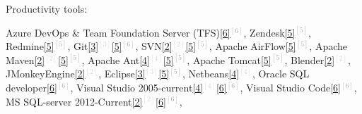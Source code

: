 \begin{cventries}
  \cventry
    {Productivity tools:} %
    {} %
    {} %
    {} %
    {
      \vspace{0.1cm}
      \begin{cvitems} %
        \item[] {        
        \textcolor{rainbowcolor-olive}{Azure DevOps \& Team Foundation Server (TFS)\textcolor{darkgray}{\textcolor{darkgray}{\ref{6}{$^{[6]}$}}}},
        \textcolor{rainbowcolor-olive}{Zendesk\textcolor{darkgray}{\ref{5}{$^{[5]}$}}},
        \textcolor{rainbowcolor-olive}{Redmine\textcolor{darkgray}{\ref{5}{$^{[5]}$}}},
        \textcolor{rainbowcolor-olive}{Git\textcolor{lightgray}{\ref{3}{$^{[3]}$}}\textcolor{darkgray}{\ref{5}{$^{[6]}$}}}, 
        \textcolor{rainbowcolor-olive}{SVN\textcolor{lightgray}{\ref{2}{$^{[2]}$}}\textcolor{darkgray}{\ref{5}{$^{[5]}$}}},
        \textcolor{rainbowcolor-olive}{Apache AirFlow\textcolor{darkgray}{\ref{5}{$^{[5]}$}}},
        \textcolor{rainbowcolor-olive}{Apache Maven\textcolor{lightgray}{\ref{2}{$^{[2]}$}}\textcolor{darkgray}{\ref{5}{$^{[5]}$}}},
        \textcolor{rainbowcolor-olive}{Apache Ant\textcolor{lightgray}{\ref{4}{$^{[4]}$}}\textcolor{darkgray}{\ref{5}{$^{[5]}$}}},  
        \textcolor{rainbowcolor-olive}{Apache Tomcat\textcolor{darkgray}{\ref{5}{$^{[5]}$}}}, 
        \textcolor{rainbowcolor-olive}{Blender\textcolor{lightgray}{\ref{2}{$^{[2]}$}}}, 
        \textcolor{rainbowcolor-olive}{JMonkeyEngine\textcolor{lightgray}{\ref{2}{$^{[2]}$}}}, 
        \textcolor{rainbowcolor-olive}{Eclipse\textcolor{lightgray}{\ref{3}{$^{[3]}$}}\textcolor{darkgray}{\ref{5}{$^{[5]}$}}},  
        \textcolor{rainbowcolor-olive}{Netbeans\textcolor{lightgray}{\ref{4}{$^{[4]}$}}}, 
        \textcolor{rainbowcolor-olive}{Oracle SQL developer\textcolor{darkgray}{\ref{6}{$^{[6]}$}}},
        \textcolor{rainbowcolor-olive}{Visual Studio 2005-current\textcolor{lightgray}{\ref{4}{$^{[4]}$}}\textcolor{darkgray}{\ref{6}{$^{[6]}$}}},
        \textcolor{rainbowcolor-olive}{Visual Studio Code\textcolor{darkgray}{\ref{6}{$^{[6]}$}}},
        \textcolor{rainbowcolor-olive}{MS SQL-server 2012-Current\textcolor{lightgray}{\ref{2}{$^{[2]}$}}\textcolor{darkgray}{\ref{6}{$^{[6]}$}}},
}
\end{cvitems}}
\end{cventries}
